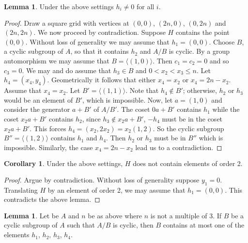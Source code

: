 \documentclass[article,dvisp]{amsart}
\theoremstyle{definition}
\newtheorem{lem}[thm]{Lemma}
\newtheorem{cor}[thm]{Corollary}
\theoremstyle{remark}
\numberwithin{equation}{section}
\theoremstyle{lemma}
\begin{document}
\begin{lem}\label{lem:61} Under the above settings $h_{i}\neq0$ for all $i$.\end{lem}

\begin{proof}  Draw a square grid with vertices at $(0,0)$, $(2n,0)$, $(0,2n)$ and $(2n,2n)$. We now proceed by contradiction. Suppose $H$ contains the point $(0,0)$. Without loss of generality we may assume that $h_{1}=(0,0)$. Choose $B$, a cyclic subgroup of $A$, so that it contains $h_{2}$ and $A/B$ is cyclic. By a group automorphism we may assume that $B=\langle (1,0)\rangle$. Then $c_{1}=c_{2}=0$ and so $c_{3}=0$. We may and do assume that $h_{3}\in B$ and $0<x_{2}<x_{3}\leq n$. Let $h_{4}=(x_{4},y_{4})$. Geometrically it follows that either $x_{4}=x_{2}$ or $x_{4}=2n-x_{2}$. 
 Assume that $x_{4}=x_{2}$. Let $B'=\langle(1,1)\rangle$. Note that $h_{4}\notin B'$; otherwise, $h_{2}$ or $h_{3}$ would be an element of $B'$, which is impossible. Now, let $a=(1,0)$ and consider the generator $a+B'$ of $A/B'$. The coset $0a+B'$ contains $h_{1}$ while the coset $x_{2}a+B'$ contains $h_{2}$, since $h_{3}\notin x_{2}a+B'$, $-h_{4}$ must be in the coset $x_{2}a+B'$. This forces $h_{4}=(x_{2},2x_{2})=x_{2}(1,2)$. So the cyclic subgroup $B''=\langle(1,2)\rangle$ contains $h_{1}$ and $h_{4}$. Then $h_{2}$ or $h_{3}$ must be in $B''$ which is impossible. Similarly, the case $x_{4}=2n-x_{2}$ lead us to a contradiction. \end{proof}

\begin{cor}\label{cor:61} Under the above settings, $H$ does not contain elements of order 2.\end{cor}
\begin{proof} Argue by contradiction. Without loss of generality suppose $y_{1}=0$. Translating $H$ by an element of order 2, we may assume that $h_{1}=(0,0)$. This contradicts the above lemma.\end{proof}

\begin{lem}\label{lem:62} Let be $A$ and $n$ be as above where $n$ is not a multiple of $3$. If $B$ be a cyclic subgroup of $A$ such that $A/B$ is cyclic, then $B$ contains at most one of the elements $h_{1}$, $h_{2}$, $h_{3}$, $h_{4}$.\end{lem}
\end{document}
